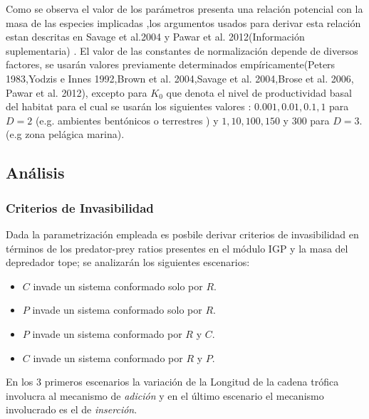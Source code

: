 \documentclass[a4paper,11pt]{article}
\begin{document}
Como se observa el valor de los par\'ametros presenta una relaci\'on potencial con la masa de las especies implicadas ,los argumentos usados para derivar esta relaci\'on estan descritas en Savage et al.2004 y Pawar et al. 2012(Informaci\'on suplementaria) . El valor de las constantes de normalizaci\'on depende de diversos factores, se usar\'an valores previamente determinados emp\'iricamente(Peters 1983,Yodzis e Innes 1992,Brown et al. 2004,Savage et al. 2004,Brose et al. 2006, Pawar et al. 2012), excepto para $K_0$ que denota el nivel de productividad basal del habitat para el cual se usar\'an los siguientes valores : $0.001,0.01,0.1,1$ para $D =2 $ (e.g. ambientes bent\'onicos o terrestres ) y $1,10,100,150$ y $300$ para $D=3$.(e.g zona pel\'agica marina).

\subsection{An\'alisis}
\subsubsection{Criterios de Invasibilidad}
Dada la parametrizaci\'on empleada es posbile derivar criterios de invasibilidad en t\'erminos de los predator-prey ratios presentes en el m\'odulo IGP y la masa del depredador tope; se analizar\'an los siguientes escenarios:
\begin{itemize}
\item $C$ invade un sistema conformado solo por $R$.
\item $P$ invade un sistema conformado solo por $R$.
\item $P$ invade un sistema conformado por $R$ y $C$.
\item $C$ invade un sistema conformado por $R$ y $P$.
\end{itemize}
En los 3 primeros escenarios la variaci\'on de la Longitud de la cadena tr\'ofica involucra al mecanismo de \textit{adici\'on} y en el \'ultimo escenario el mecanismo involucrado es el de \textit{inserci\'on}.
\end{document}
